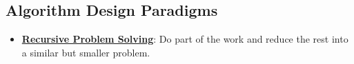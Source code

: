 \documentclass{article}%
\begin{document}
\subsection{Algorithm Design Paradigms}%
\label{subsec:AlgorithmDesignParadigms}%
\begin{itemize}[leftmargin=*]%
\item \href{https://purdue.brightspace.com/d2l/common/assets/pdfjs-d2l-dist/1.0.14-legacy/web/viewer.html?file=%2Fcontent%2Fenforced%2F1095467-wl.202510.CS.24300.001%2F14L1-DepthFS.pdf%3Fou%3D1095467&lang=en-us&container=d2l-fileviewer-rendered-pdf&fullscreen=d2l-fileviewer-rendered-pdf-dialog&height=667#page=4}{\textbf{Recursive Problem Solving}}: Do part of the work and reduce the rest into a similar but smaller problem.%
\end{itemize}

%
\end{document}
